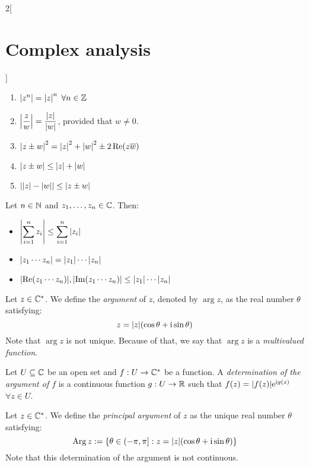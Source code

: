 \documentclass[../../../main.tex]{subfiles}
\begin{document}
\begin{multicols}{2}[\section{Complex analysis}]
\begin{proposition}
\begin{enumerate}
      \item $\abs{z^n}={\abs{z}}^n$ $\forall n\in\mathbb{Z}$
      \item $\displaystyle\abs{\frac{z}{w}}=\frac{\abs{z}}{\abs{w}}$, provided that $w\ne 0$.
      \item ${\abs{z\pm w}}^2={\abs{z}}^2+{\abs{w}}^2\pm 2\Re(z\overline{w})$
      \item $\abs{z\pm w}\leq \abs{z}+ \abs{w}$
      \item $\abs{\abs{z}-\abs{w}}\leq \abs{z\pm w}$
    \end{enumerate}
  \end{proposition}
  \begin{corollary}
    Let $n\in\mathbb{N}$ and $z_1, \ldots, z_n \in \mathbb{C}$. Then:
    \begin{itemize}
      \item $\displaystyle \abs{\sum_{i=1}^n{z_i}} \leq \sum_{i=1}^n{\abs{z_i}}$
      \item $\displaystyle \abs{z_1 \cdots z_n} = \abs{z_1} \cdots \abs{z_n}$
      \item $\displaystyle \abs{\Re(z_1 \cdots z_n)},\abs{\Im(z_1 \cdots z_n)} \leq \abs{z_1} \cdots \abs{z_n}$
    \end{itemize}
  \end{corollary}
  \begin{definition}
    Let $z \in \mathbb{C}^*$. We define the \textit{argument} of $z$, denoted by $\arg{z}$, as the real number $\theta$ satisfying: $$z = \abs{z}(\cos{\theta} + \mathrm{i}\sin{\theta})$$ Note that $\arg{z}$ is not unique. Because of that, we say that $\arg z$ is a \emph{multivalued function}.
  \end{definition}
  \begin{definition}
    Let $U\subseteq\mathbb{C}$ be an open set and $f: U\rightarrow\mathbb{C}^*$ be a function. A \emph{determination of the argument of $f$} is a continuous function $g:U\rightarrow \mathbb{R}$ such that $f(z)=\abs{f(z)}\mathrm{e}^{\mathrm{i} g(z)}$ $\forall z\in U$.
  \end{definition}
  \begin{definition}
    Let $z \in \mathbb{C}^*$. We define the \textit{principal argument} of $z$ as the unique real number $\theta$ satisfying:
    $$\operatorname{Arg} z := \{\theta \in (-\pi, \pi]:z = \abs{z}(\cos{\theta} + \mathrm{i}\sin{\theta})\}$$
    Note that this determination of the argument is not continuous.

\end{definition}
\end{multicols}
\end{document}
